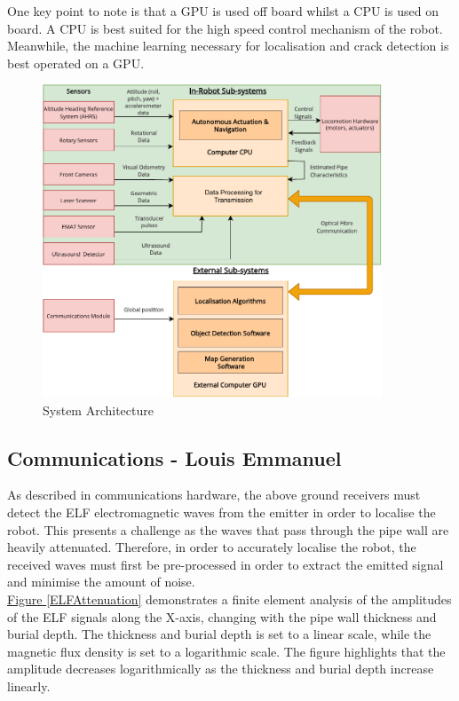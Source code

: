 \documentclass[11pt]{article}		%
\newcommand{\figref}[1]{\hyperref[#1]{Figure \ref*{#1}}}    %
\begin{document}
      		\hspace*{3ex}One key point to note is that a GPU is used off board whilst a CPU is used on board. A CPU is best suited for the high speed control mechanism of the robot. Meanwhile, the machine learning necessary for localisation and crack detection is best operated on a GPU.
	          
    		\begin{figure}[h]
				\centering
				\includegraphics[width = 0.9\textwidth]{Systems-overall.pdf}
				\caption{System Architecture}
				\label{overalls}
			\end{figure}
		      
		\subsection[Communications]{Communications - Louis Emmanuel}
		
			As described in communications hardware, the above ground receivers must detect the ELF electromagnetic waves from the emitter in order to localise the robot.
			This presents a challenge as the waves that pass through the pipe wall are heavily attenuated. 
			Therefore, in order to accurately localise the robot, the received waves must first be pre-processed in order to extract the emitted signal and minimise the amount of noise.
			\\
		    \hspace*{3ex}\figref{ELFAttenuation}  demonstrates a finite element analysis of the amplitudes of the ELF signals along the X-axis, changing with the pipe wall thickness and burial depth.
		    The thickness and burial depth is set to a linear scale, while the magnetic flux density is set to a logarithmic scale.
		    The figure highlights that the amplitude decreases logarithmically as the thickness and burial depth increase linearly.
		    
\end{document}
